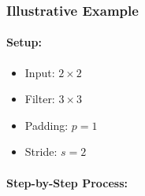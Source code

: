 \documentclass[letterpaper,12pt,notitlepage,twoside]{report}
\begin{document}
\subsubsection*{Illustrative Example}

\paragraph{Setup:} 
\begin{itemize}[nosep]
    \item Input: $2 \times 2$
    \item Filter: $3 \times 3$
    \item Padding: $p = 1$
    \item Stride: $s = 2$
\end{itemize}

\paragraph{Step-by-Step Process:}
\end{document}
